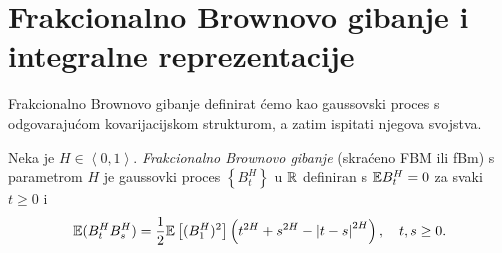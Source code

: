 \documentclass[main.tex]{subfiles}
\begin{document}
\section[FBM i integralne reprezentacije]{Frakcionalno Brownovo gibanje i integralne reprezentacije}\label{sec:fbm}
Frakcionalno Brownovo gibanje definirat ćemo kao gaussovski proces
s odgovarajućom kovarijacijskom strukturom, a zatim ispitati njegova svojstva.

\begin{definicija}\label{def:fbm}
	Neka je \( H \in \left\langle 0,1 \right\rangle \). \emph{Frakcionalno Brownovo gibanje} (skraćeno FBM ili fBm) s parametrom \( H \) je gaussovki proces \( \left\{ B^H_t \right\} \) u \( \mathbb{R} \) definiran s
	\( \mathbb{E} B^H_t = 0 \) za svaki \( t \ge 0 \) i
	\begin{equation} \label{eq:deffbm}
		\mathbb{E}(B^H_t B^H_s) = \frac 12 \mathbb{E} \left[ (B^H_1)^2 \right]
		\left( t^{2H} + s^{2H} - \left| {t-s} \right|^{2H} \right), \quad t,s\ge 0.
	\end{equation}
\end{definicija}
\end{document}
